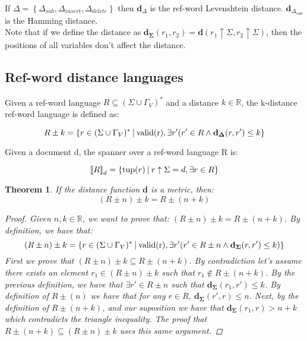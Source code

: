 \documentclass{article}
\newcommand{\set}[1]{\left\{#1\right\}}
\newcommand{\st}{\ \vline \ }
\newcommand{\dbrack}[1]{\left\llbracket#1\right\rrbracket}
\newtheorem{theorem}{Theorem}
\begin{document}
If $\Delta = \set{\Delta_{sub}, \Delta_{insert}, \Delta_{delete}}$ then $\mathbf{d}_{\Delta}$ is the ref-word Levenshtein distance. $\mathbf{d}_{\Delta_{sub}}$ is the Hamming distance.
\\


Note that if we define the distance as $\mathbf{d_\Sigma}(r_1, r_2) = \mathbf{d}(r_1 \uparrow
\Sigma, r_2 \uparrow \Sigma)$, then the positions of all variables don't affect the distance.

\subsection*{Ref-word distance languages}

Given a ref-word language $R \subseteq (\Sigma\cup\Gamma_V)^*$ and
a distance $k \in \mathbb{R}$, the k-distance ref-word language is
defined as:

\begin{equation}
    R \pm k = \set{r \in (\Sigma \cup \Gamma_V)^* \st  \mathrm{valid(r)},
    \exists r' (r'\in R \land \mathbf{d_\Delta}(r, r') \leq k }
\end{equation}

Given a document d, the spanner over a ref-word language R is:

\begin{equation}
    \dbrack{R}_d = \set{\mathrm{tup}(r) \st r\uparrow \Sigma = d,
    \exists r \in R}
\end{equation}

\newpage
\begin{theorem}\label{TheoremMetric}
    If the distance function $\mathbf{d}$ is a metric, then:
    \begin{equation}
        (R\pm n) \pm k = R\pm(n + k)
    \end{equation}
    \begin{proof}
	Given $n, k \in \mathbb{R}$, we want to prove that: $(R\pm
	n )\pm k = R \pm (n + k)$.
    By definition, we have that:
    \begin{equation*}
        (R \pm n) \pm k = \set{r \in (\Sigma \cup \Gamma_V)^* \st  \mathrm{valid(r)}, \exists r' (r'\in R \pm n \land \mathbf{d_\Sigma}(r, r') \leq k)}
    \end{equation*}
    First we prove that $(R \pm n) \pm k \subseteq R \pm (n + k)$.
    By contradiction let's assume there exists an element $r_1 \in
    (R \pm n) \pm k$ such that $r_1 \notin R\pm (n + k)$. By the
    previous definition, we have that $\exists r' \in R\pm n$ such
    that $\mathbf{d_\Sigma}(r_1, r') \leq k$. By definition of $R
    \pm (n)$ we have that for any $r \in R$, $\mathbf{d_\Sigma}(r',
    r) \leq n$. Next, by the definition of $R \pm (n + k)$, and our
    suposition we have that $\mathbf{d_\Sigma}(r_1, r) > n + k$
    which contradicts the triangle inequality. The proof that $R
    \pm (n + k) \subseteq (R \pm n) \pm k$ uses this same argument.

    \end{proof}
\end{theorem}
\end{document}
